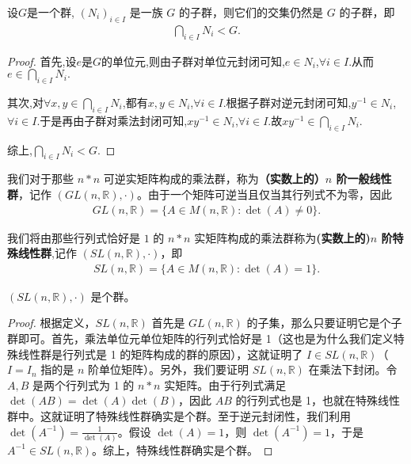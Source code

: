 \documentclass[../../main.tex]{subfiles}
\begin{document}
\begin{proposition}[子群的任意交仍是子群]\label{proposition:子群的任意交仍是子群}
设$G$是一个群, $(N_i)_{i\in I}$ 是一族 $G$ 的子群，则它们的交集仍然是 $G$ 的子群，即
\begin{align*}
\bigcap_{i\in I}N_i< G .
\end{align*}
\end{proposition}
\begin{proof}
首先,设$e$是$G$的单位元,则由子群对单位元封闭可知,$e\in N_i$,$\forall i\in I$.从而$e\in \bigcap_{i\in I}N_i.$

其次,对$\forall x,y\in \bigcap_{i\in I}N_i$,都有$x,y\in N_i$,$\forall i\in I$.根据子群对逆元封闭可知,$y^{-1}\in N_i$,$\forall i\in I$.于是再由子群对乘法封闭可知,$xy^{-1}\in N_i$,$\forall i\in I$.故$xy^{-1}\in \bigcap_{i\in I}N_i.$

综上,$\bigcap_{i\in I}N_i< G .$
\end{proof}

\begin{definition}[一般线性群]
我们对于那些 $n*n$ 可逆实矩阵构成的乘法群，称为\textbf{（实数上的）$n$ 阶一般线性群}，记作 $(GL(n, \mathbb{R}), \cdot)$。由于一个矩阵可逆当且仅当其行列式不为零，因此
\begin{align*}
GL(n, \mathbb{R}) = \{A \in M(n, \mathbb{R}) : \det(A) \neq 0\}.
\end{align*} 
\end{definition}

\begin{definition}[特殊线性群]
我们将由那些行列式恰好是 $1$ 的 $n*n$ 实矩阵构成的乘法群称为\textbf{(实数上的)$n$ 阶特殊线性群},记作 $(SL(n, \mathbb{R}), \cdot)$，即
\begin{align*}
SL(n, \mathbb{R}) = \{A \in M(n, \mathbb{R}) : \det(A) = 1\}.
\end{align*} 
\end{definition}

\begin{proposition}
$(SL(n, \mathbb{R}), \cdot)$ 是个群。
\end{proposition}
\begin{proof}
根据定义，$SL(n, \mathbb{R})$ 首先是 $GL(n, \mathbb{R})$ 的子集，那么只要证明它是个子群即可。首先，乘法单位元单位矩阵的行列式恰好是 1（这也是为什么我们定义特殊线性群是行列式是 1 的矩阵构成的群的原因），这就证明了 $I \in SL(n, \mathbb{R})$（$I = I_n$ 指的是 $n$ 阶单位矩阵）。另外，我们要证明 $SL(n, \mathbb{R})$ 在乘法下封闭。令 $A, B$ 是两个行列式为 1 的 $n*n$ 实矩阵。由于行列式满足 $\det(AB) = \det(A)\det(B)$，因此 $AB$ 的行列式也是 1，也就在特殊线性群中。这就证明了特殊线性群确实是个群。至于逆元封闭性，我们利用 $\det(A^{-1}) = \frac{1}{\det(A)}$。假设 $\det(A) = 1$，则 $\det(A^{-1}) = 1$，于是 $A^{-1} \in SL(n, \mathbb{R})$。综上，特殊线性群确实是个群。 
\end{proof}
\end{document}
